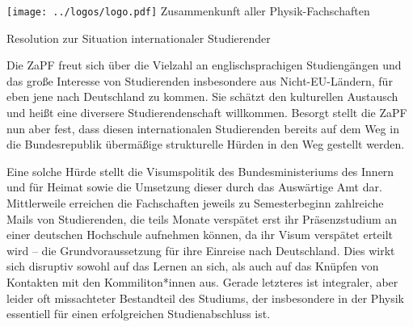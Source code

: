\documentclass[DIV=calc]{scrartcl}
\begin{document}
\hspace{0.87\textwidth}
\begin{minipage}{120pt}
	\vspace{-1.8cm}
	\texttt{[image: ../logos/logo.pdf]}
	\centering
	\small Zusammenkunft aller Physik-Fachschaften
\end{minipage}

\begin{center}
  \huge{Resolution zur Situation internationaler Studierender}\vspace{.25\baselineskip}\\
  \normalsize
\end{center}
\vspace{1cm}







Die ZaPF freut sich über die Vielzahl an englischsprachigen Studiengängen und das  große Interesse von Studierenden insbesondere aus Nicht-EU-Ländern, für eben jene nach Deutschland zu kommen. Sie schätzt den kulturellen Austausch und heißt eine diversere Studierendenschaft willkommen. Besorgt stellt die ZaPF nun aber fest, dass diesen internationalen Studierenden bereits auf dem Weg in die Bundesrepublik übermäßige strukturelle Hürden in den Weg gestellt werden.

Eine solche Hürde stellt die Visumspolitik des Bundesministeriums des Innern und für Heimat sowie die Umsetzung dieser durch das Auswärtige Amt dar. Mittlerweile erreichen die Fachschaften jeweils zu Semesterbeginn zahlreiche Mails von Studierenden, die teils Monate verspätet erst ihr Präsenzstudium an einer deutschen Hochschule aufnehmen können, da ihr Visum verspätet erteilt wird – die Grundvoraussetzung für ihre Einreise nach Deutschland. Dies wirkt sich disruptiv sowohl auf das Lernen an sich, als auch auf das Knüpfen von Kontakten mit den Kommiliton*innen aus. Gerade letzteres ist integraler, aber leider oft missachteter Bestandteil des Studiums, der insbesondere in der Physik essentiell für einen erfolgreichen Studienabschluss ist.
\end{document}
